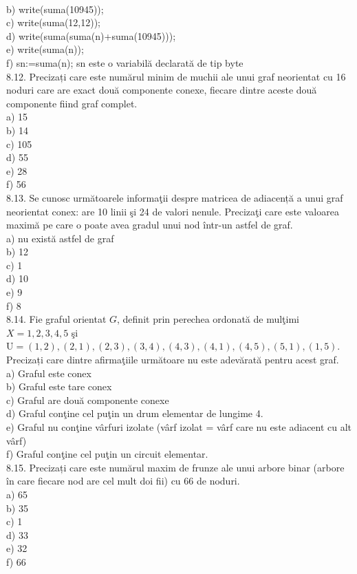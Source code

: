 \\
b) write(suma(10945));
\\
c) write(suma(12,12));
\\
d) write(suma(suma(n)+suma(10945)));
\\
e) write(suma(n));
\\
f) sn:=suma(n); {sn este o variabilă declarată de tip byte }
\\
8.12. Precizați care este numărul minim de muchii ale unui graf neorientat cu 16 noduri care are exact două componente conexe, fiecare dintre aceste două componente fiind graf complet.
\\
a) 15
\\
b) 14
\\
c) 105
\\
d) 55
\\
e) 28
\\
f) 56
\\
8.13. Se cunosc următoarele informaţii despre matricea de adiacență a unui graf neorientat conex: are 10 linii şi 24 de valori nenule. Precizaţi care este valoarea maximă pe care o poate avea gradul unui nod într-un astfel de graf.
\\
a) nu există astfel de graf
\\
b) 12
\\
c) 1
\\
d) 10
\\
e) 9
\\
f) 8
\\
8.14. Fie graful orientat $G$, definit prin perechea ordonată de mulţimi $X={1,2,3,4,5}$ şi $\mathrm{U}={(1,2),(2,1),(2,3),(3,4),(4,3),(4,1),(4,5),(5,1),(1,5)}$.
Precizați care dintre afirmaţiile următoare nu este adevărată pentru acest graf.
\\
a) Graful este conex
\\
b) Graful este tare conex
\\
c) Graful are două componente conexe
\\
d) Graful conţine cel puţin un drum elementar de lungime 4.
\\
e) Graful nu conţine vârfuri izolate (vârf izolat = vârf care nu este adiacent cu alt vârf)
\\
f) Graful conţine cel puţin un circuit elementar.
\\
8.15. Precizați care este numărul maxim de frunze ale unui arbore binar (arbore în care fiecare nod are cel mult doi fii) cu 66 de noduri.\\
a) 65
\\
b) 35
\\
c) 1
\\
d) 33
\\
e) 32
\\
f) 66
\\

